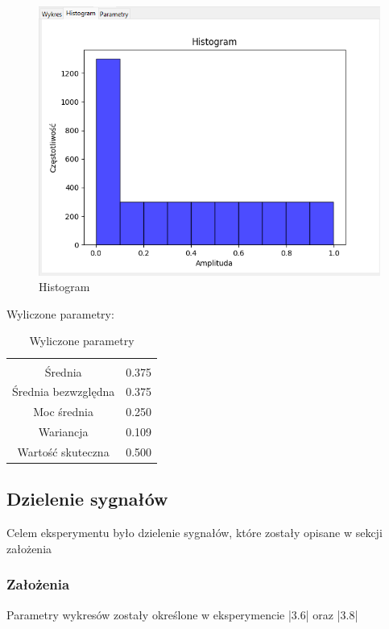 \documentclass{article}
\begin{document}
\begin{figure}[h!]
    \centering
    \includegraphics[width=\textwidth]{img/mul/hist.png}
    \caption{Histogram}
\end{figure}
\FloatBarrier
Wyliczone parametry:
\begin{table}[h!]
    \centering
    \vspace{0.2cm}
    \begin{tabular}{|c|c|}
        \hline\hline\\[-0.4cm]
        Średnia & 0.375 \\
        \hline
        Średnia bezwzględna & 0.375  \\
        \hline
        Moc średnia & 0.250  \\
        \hline
        Wariancja & 0.109 \\
        \hline
        Wartość skuteczna & 0.500 \\
        \hline
    \end{tabular}
    \caption{Wyliczone parametry}
    \label{mul}
\end{table}   

\subsection{Dzielenie sygnałów} \label{div} 

Celem eksperymentu było dzielenie sygnałów, które zostały opisane w sekcji założenia

\subsubsection{Założenia} 
    Parametry wykresów zostały określone w eksperymencie |3.6| oraz |3.8|
\end{document}
